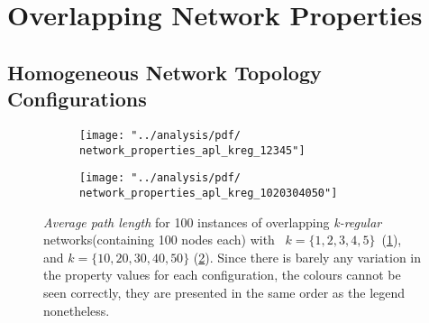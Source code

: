 
\renewcommand\thefigure{\thesection.\arabic{figure}}    
\setcounter{figure}{0}   

\renewcommand\thetable{\thesection.\arabic{table}}    
\setcounter{table}{0}     

\section{Overlapping Network Properties}

\subsection{Homogeneous Network Topology Configurations}
\begin{figure}[H]
\centering
\begin{subfigure}{.49\linewidth}
  \centering
 \texttt{[image: "../analysis/pdf/ network\_properties\_apl\_kreg\_12345"]}
 \caption{}
 \label{append_fig:network_properties_apl_kreg_12345}
\end{subfigure}%
\begin{subfigure}{.49\linewidth}
  \centering
 \texttt{[image: "../analysis/pdf/ network\_properties\_apl\_kreg\_1020304050"]}
 \caption{}
 \label{append_fig:network_properties_apl_kreg_1020304050}
\end{subfigure}
\begin{minipage}{0.9\linewidth}
\vspace{0.2cm}
\caption{\textit{Average path length} for 100 instances of overlapping \textit{k-regular} networks(containing 100 nodes each) with ~$k=\{1,2,3,4,5\}$~(\ref{append_fig:network_properties_apl_kreg_12345}), and  $k= \{10,20,30,40,50\}$ (\ref{append_fig:network_properties_apl_kreg_1020304050}). Since there is barely any variation in the property values for each configuration, the colours cannot be seen correctly, they are presented in the same order as the legend nonetheless.}
\label{append_fig:network_properties_apl_kreg}
\end{minipage}

\end{figure}

